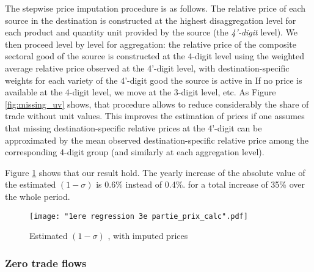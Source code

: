 \documentclass[12pt,twoside,a4paper,notitlepage]{article}
\begin{document}
The stepwise price imputation procedure is as follows.
The relative price of each source in the destination is constructed at the highest disaggregation level for each product and quantity unit provided by the source (the \textit{4'-digit} level).
We then proceed level by level for aggregation: the relative price of the composite sectoral good of the source is constructed at the 4-digit level using the weighted average relative price observed at the 4'-digit level, with destination-specific weights for each variety of the 4'-digit good the source is active in%
If no price is available at the 4-digit level, we move at the 3-digit level, etc.
As Figure \ref{fig:missing_uv} shows, that procedure allows to reduce considerably the share of trade without unit values.
This improves the estimation of prices if one assumes that missing destination-specific relative prices at the 4'-digit can be approximated by the mean observed destination-specific relative price among the corresponding 4-digit group (and similarly at each aggregation level).

Figure \ref{fig:reg_prix_calc} shows that our result hold. The yearly increase of the absolute value of the estimated $\left(1-\sigma \right)$ is 0.6\% instead of 0.4\%. for a total increase of 35\% over the whole period.

\begin{figure}
	\caption{Estimated $(1-\sigma)$ , with imputed prices}
	\texttt{[image: "1ere regression 3e partie\_prix\_calc".pdf]}
	\label{fig:reg_prix_calc}
\end{figure}



\subsubsection{ Zero trade flows\label{mark-2.2.}}
\end{document}
